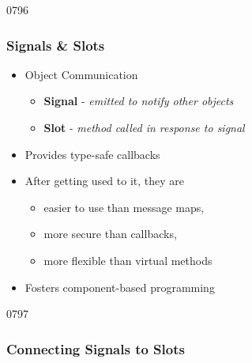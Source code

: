 \begin{slide}{0796}\frametitle{Signals \& Slots}
   
  \label{signals_and_slots}
  \begin{itemize}
  \item Object Communication
    \begin{itemize}
    \item \textbf{Signal} - \textit{emitted to notify other objects}
    \item \textbf{Slot} - \textit{method called in response to signal}
   \end{itemize}
  \item Provides type-safe callbacks
  \item After getting used to it, they are
    \begin{itemize}
    \item easier to use than message maps,
    \item more secure than callbacks,
    \item more flexible than virtual methods
    \end{itemize}
  \item Fosters component-based programming
 \end{itemize}
\end{slide}



\begin{slide}[fragile]{0797}\frametitle{Connecting Signals to Slots}
\begin{overprint}
   
   
   
   
   
   
   
    \\ 

\end{overprint}
\end{slide}

